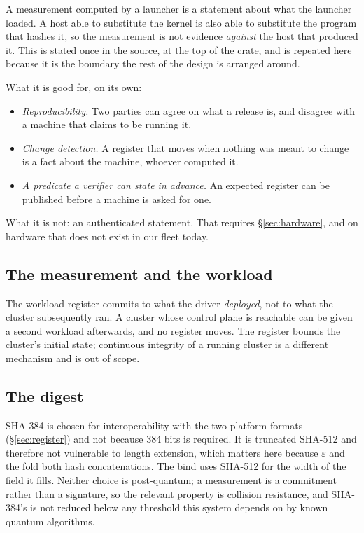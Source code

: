 \documentclass[11pt,a4paper]{article}
\begin{document}
A measurement computed by a launcher is a statement about what the launcher
loaded. A host able to substitute the kernel is also able to substitute the
program that hashes it, so the measurement is not evidence \emph{against} the host
that produced it. This is stated once in the source, at the top of the crate, and
is repeated here because it is the boundary the rest of the design is arranged
around.

What it is good for, on its own:

\begin{itemize}
\item \emph{Reproducibility.} Two parties can agree on what a release is, and
  disagree with a machine that claims to be running it.
\item \emph{Change detection.} A register that moves when nothing was meant to
  change is a fact about the machine, whoever computed it.
\item \emph{A predicate a verifier can state in advance.} An expected register can
  be published before a machine is asked for one.
\end{itemize}

What it is not: an authenticated statement. That requires \S\ref{sec:hardware},
and on hardware that does not exist in our fleet today.

\subsection{The measurement and the workload}

The workload register commits to what the driver \emph{deployed}, not to what the
cluster subsequently ran. A cluster whose control plane is reachable can be given
a second workload afterwards, and no register moves. The register bounds the
cluster's initial state; continuous integrity of a running cluster is a different
mechanism and is out of scope.

\subsection{The digest}

SHA-384 is chosen for interoperability with the two platform formats
(\S\ref{sec:register}) and not because 384 bits is required. It is truncated
SHA-512 and therefore not vulnerable to length extension, which matters here
because $\varepsilon$ and the fold both hash concatenations. The bind uses
SHA-512 for the width of the field it fills. Neither choice is post-quantum; a
measurement is a commitment rather than a signature, so the relevant property is
collision resistance, and SHA-384's is not reduced below any threshold this system
depends on by known quantum algorithms.
\end{document}
